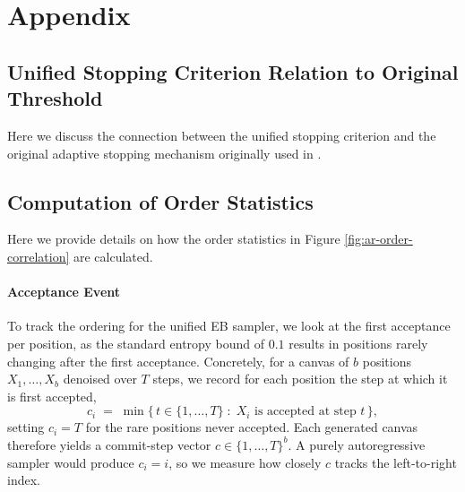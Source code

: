 \section{Appendix}

\subsection{Unified Stopping Criterion Relation to Original Threshold}
\label{app:unified-connection}
Here we discuss the connection between the unified stopping criterion and the original adaptive stopping mechanism originally used in \citet{team2026diffusiongemma}.



\subsection{Computation of Order Statistics}
\label{app:order-stats}
Here we provide details on how the order statistics in Figure \ref{fig:ar-order-correlation} are calculated. 

\paragraph{Acceptance Event}
To track the ordering for the unified EB sampler, we look at the first
acceptance per position, as the standard entropy bound of $0.1$ results in
positions rarely changing after the first acceptance. Concretely, for a
canvas of $b$ positions $X_1,\dots,X_b$ denoised over $T$ steps, we record
for each position the step at which it is first accepted,
\begin{equation}
  c_i \;=\; \min\bigl\{\, t \in \{1,\dots,T\} \;:\; X_i \text{ is accepted at step } t \,\bigr\},
\end{equation}
setting $c_i = T$ for the rare positions never accepted. Each generated
canvas therefore yields a commit-step vector $c \in \{1,\dots,T\}^{b}$. A
purely autoregressive sampler would produce $c_i = i$, so we measure how
closely $c$ tracks the left-to-right index.

